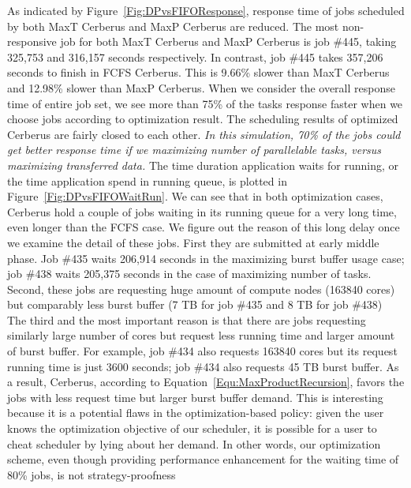 As indicated by Figure~\ref{Fig:DPvsFIFOResponse}, response time of
jobs scheduled by both MaxT Cerberus and MaxP Cerberus are reduced.
The most non-responsive job for both MaxT Cerberus and MaxP Cerberus is job \#445,
taking 325,753 and 316,157 seconds respectively.
In contrast, job \#445 takes 357,206 seconds to finish in FCFS Cerberus.
This is 9.66\% slower than MaxT Cerberus and 12.98\% slower than MaxP Cerberus.
When we consider the overall response time of entire job set,
we see more than 75\% of the tasks response faster when we choose jobs according to
optimization result.
The scheduling results of optimized Cerberus are fairly closed to each other.
\textit{In this simulation, 70\% of the jobs could get better response time
if we maximizing number of parallelable tasks,
versus maximizing transferred data.}
The time duration application waits for running,
or the time application spend in running queue,
is plotted in Figure~\ref{Fig:DPvsFIFOWaitRun}.
We can see that in both optimization cases, Cerberus hold a couple of jobs waiting
in its running queue for a very long time,
even longer than the FCFS case.
We figure out the reason of this long delay once we examine the detail of these jobs.
First they are submitted at early middle phase.
Job \#435 waits 206,914 seconds in the maximizing burst buffer usage case;
job \#438 waits 205,375 seconds in the case of maximizing number of tasks.
Second, these jobs are requesting huge amount of compute nodes (163840 cores)
but comparably less burst buffer (7 TB for job \#435 and 8 TB for job \#438)
The third and the most important reason is that there are jobs requesting similarly
large number of cores but request less running time and larger amount of burst buffer.
For example, job \#434 also requests 163840 cores
but its request running time is just 3600 seconds;
job \#434 also requests 45 TB burst buffer.
As a result, Cerberus, according to Equation~\ref{Equ:MaxProductRecursion},
favors the jobs with less request time but larger burst buffer demand.
This is interesting because it is a potential flaws in the optimization-based policy:
given the user knows the optimization objective of our scheduler,
it is possible for a user to cheat scheduler by lying about her demand.
In other words, our optimization scheme, even though providing performance enhancement
for the waiting time of 80\% jobs, is not strategy-proofness\cite{Ghodsi:NSDI:2011}


